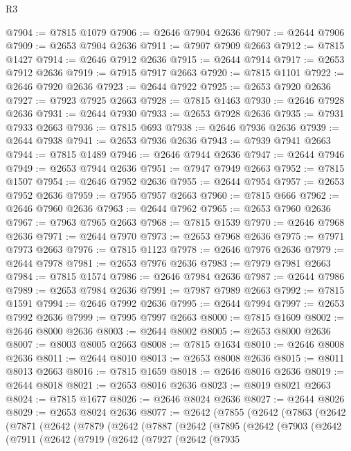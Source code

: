 \begin{lexlean}{R3}
\begin{coremodule}
@7904 := @7815 @1079
@7906 := @2646 @7904 @2636
@7907 := @2644 @7906
@7909 := @2653 @7904 @2636
@7911 := @7907 @7909 @2663
@7912 := @7815 @1427
@7914 := @2646 @7912 @2636
@7915 := @2644 @7914
@7917 := @2653 @7912 @2636
@7919 := @7915 @7917 @2663
@7920 := @7815 @1101
@7922 := @2646 @7920 @2636
@7923 := @2644 @7922
@7925 := @2653 @7920 @2636
@7927 := @7923 @7925 @2663
@7928 := @7815 @1463
@7930 := @2646 @7928 @2636
@7931 := @2644 @7930
@7933 := @2653 @7928 @2636
@7935 := @7931 @7933 @2663
@7936 := @7815 @693
@7938 := @2646 @7936 @2636
@7939 := @2644 @7938
@7941 := @2653 @7936 @2636
@7943 := @7939 @7941 @2663
@7944 := @7815 @1489
@7946 := @2646 @7944 @2636
@7947 := @2644 @7946
@7949 := @2653 @7944 @2636
@7951 := @7947 @7949 @2663
@7952 := @7815 @1507
@7954 := @2646 @7952 @2636
@7955 := @2644 @7954
@7957 := @2653 @7952 @2636
@7959 := @7955 @7957 @2663
@7960 := @7815 @666
@7962 := @2646 @7960 @2636
@7963 := @2644 @7962
@7965 := @2653 @7960 @2636
@7967 := @7963 @7965 @2663
@7968 := @7815 @1539
@7970 := @2646 @7968 @2636
@7971 := @2644 @7970
@7973 := @2653 @7968 @2636
@7975 := @7971 @7973 @2663
@7976 := @7815 @1123
@7978 := @2646 @7976 @2636
@7979 := @2644 @7978
@7981 := @2653 @7976 @2636
@7983 := @7979 @7981 @2663
@7984 := @7815 @1574
@7986 := @2646 @7984 @2636
@7987 := @2644 @7986
@7989 := @2653 @7984 @2636
@7991 := @7987 @7989 @2663
@7992 := @7815 @1591
@7994 := @2646 @7992 @2636
@7995 := @2644 @7994
@7997 := @2653 @7992 @2636
@7999 := @7995 @7997 @2663
@8000 := @7815 @1609
@8002 := @2646 @8000 @2636
@8003 := @2644 @8002
@8005 := @2653 @8000 @2636
@8007 := @8003 @8005 @2663
@8008 := @7815 @1634
@8010 := @2646 @8008 @2636
@8011 := @2644 @8010
@8013 := @2653 @8008 @2636
@8015 := @8011 @8013 @2663
@8016 := @7815 @1659
@8018 := @2646 @8016 @2636
@8019 := @2644 @8018
@8021 := @2653 @8016 @2636
@8023 := @8019 @8021 @2663
@8024 := @7815 @1677
@8026 := @2646 @8024 @2636
@8027 := @2644 @8026
@8029 := @2653 @8024 @2636
@8077 := @2642
    (@7855
      (@2642
        (@7863
          (@2642
            (@7871
              (@2642
                (@7879
                  (@2642
                    (@7887
                      (@2642
                        (@7895
                          (@2642
                            (@7903
                              (@2642
                                (@7911
                                  (@2642
                                    (@7919
                                      (@2642
                                        (@7927
                                          (@2642
                                            (@7935

\end{coremodule}
\end{lexlean}
